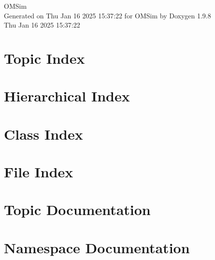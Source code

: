 \documentclass[twoside]{book}
\newcommand{\+}{\discretionary{\mbox{\scriptsize$\hookleftarrow$}}{}{}}
\newcommand{\clearemptydoublepage}{%
    \newpage{\pagestyle{empty}\cleardoublepage}%
  }
\begin{document}
  \raggedbottom
    \hypersetup{pageanchor=false,
                bookmarksnumbered=true,
                pdfencoding=unicode
               }
  \begin{titlepage}
  \vspace*{7cm}
  \begin{center}%
  {\Large OMSim}\\
  \vspace*{1cm}
  {\large Generated on Thu Jan 16 2025 15\+:37\+:22 for OMSim by Doxygen 1.9.8}\\
    \vspace*{0.5cm}
    {\small Thu Jan 16 2025 15:37:22}
  \end{center}
  \end{titlepage}
  \clearemptydoublepage
  \tableofcontents
  \clearemptydoublepage
  \hypersetup{pageanchor=true}








\chapter{Topic Index}

\chapter{Hierarchical Index}

\chapter{Class Index}

\chapter{File Index}

\chapter{Topic Documentation}




\chapter{Namespace Documentation}



\end{document}
